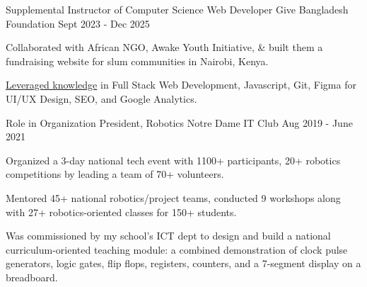 \begin{cventries}
    \vspace{-1.0mm}
\cventryalt
    {Supplemental Instructor of Computer Science} %
    {Web Developer} %
    {Give Bangladesh Foundation} %
    {Sept 2023 - Dec 2025} %
    {
      \begin{cvitems}
      \item {Collaborated with African NGO, Awake Youth Initiative, \& built them a fundraising website for slum communities in Nairobi, Kenya.}
      \item {\underline{Leveraged knowledge} in Full Stack Web Development, Javascript, Git, Figma for UI/UX Design, SEO, and Google Analytics.}
      \end{cvitems}
    }
    \vspace{-1.0mm}
  \cventryalt
    {Role in Organization} %
    {President, Robotics} %
    { Notre Dame IT Club} %
    {Aug 2019 - June 2021} %
    {
      \begin{cvitems} %
        \item {Organized a 3-day national tech event with 1100+ participants, 20+ robotics competitions by leading a team of 70+ volunteers.}
        \item {Mentored 45+ national robotics/project teams, conducted 9 workshops along with 27+ robotics-oriented classes for 150+ students.}
        \item {Was commissioned by my school’s ICT dept to design and build a national curriculum-oriented teaching module: 
        a combined demonstration of clock pulse generators, logic gates, flip flops, registers, counters, and a 7-segment display on a breadboard.}
      \end{cvitems}
    }
\end{cventries}
